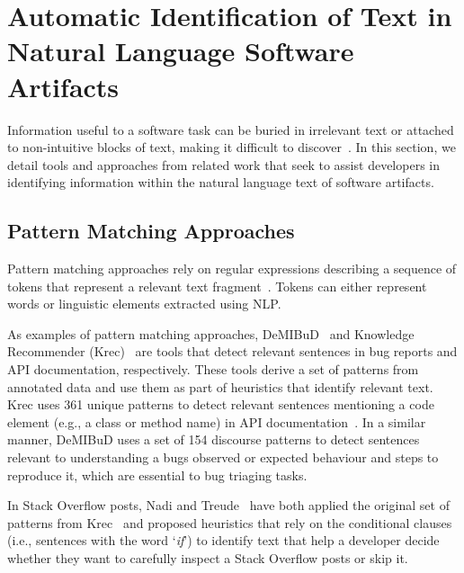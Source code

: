 \section{Automatic Identification of Text in Natural Language Software Artifacts}
\label{cp2:text-approaches}



Information useful to a software task can be buried in irrelevant text or attached to 
non-intuitive blocks of text, making it difficult to discover~\cite{Robillard2015}.
In this section, we detail tools and approaches from related work
that seek to assist developers in 
identifying information within the natural language
text of software artifacts.





\subsection{Pattern Matching Approaches}
\label{cp2:pattern-matching}


Pattern matching approaches rely on regular expressions describing a sequence of tokens that represent
 a relevant text fragment~\cite{Bavota2016}. Tokens can either represent words or linguistic elements 
extracted using \acf{NLP}.
    
    
As examples  of pattern matching approaches,  {\small DeMIBuD}~\cite{Chaparro2017}
 and Knowledge Recommender (Krec)~\cite{Maalej2013, Robillard2015} are tools that detect relevant sentences in bug reports and API documentation, respectively. 
These tools derive a set of patterns from annotated data and use them as part of heuristics 
that identify relevant text. Krec  uses  361 unique patterns
to 
detect relevant sentences mentioning a 
code element (e.g., a class or method name) in API documentation~\cite{Robillard2015}.
In a similar manner, {\small DeMIBuD} uses a set of 154 discourse patterns to detect sentences 
relevant to understanding a bugs observed or expected behaviour and steps to reproduce it,
which are essential to bug triaging tasks.




In Stack Overflow posts,
Nadi and Treude~\cite{nadi2020} have both applied the original set of patterns from Krec~\cite{Robillard2015} 
and proposed heuristics that rely on the conditional clauses (i.e., sentences with the word `\textit{if}')
to identify text that help a developer 
decide whether they want to carefully inspect a Stack Overflow posts or skip it. 



